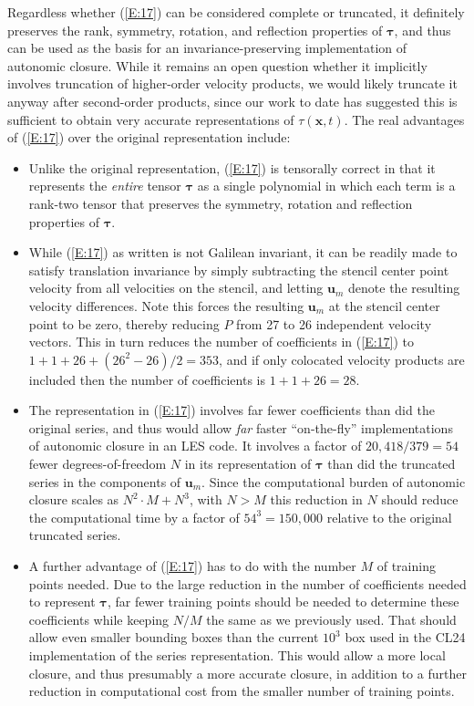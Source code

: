 Regardless whether (\ref{E:17}) can be considered complete or truncated, it definitely preserves the rank, symmetry, rotation, and reflection properties of $\mathbf{\tau}$, and thus can be used as the basis for an invariance-preserving implementation of autonomic closure. While it remains an open question whether it implicitly involves truncation of higher-order velocity products, we would likely truncate it anyway after second-order products, since our work to date has suggested this is sufficient to obtain very accurate representations of $\tau(\mathbf{x},t)$. The real advantages of (\ref{E:17}) over the original  representation include:

\begin{itemize}
	\item 	Unlike the original  representation, (\ref{E:17}) is tensorally correct in that it represents the \textit{entire} tensor  $\mathbf{\tau}$ as a single polynomial in which each term is a rank-two tensor that preserves the symmetry, rotation and reflection properties of $\mathbf{\tau}$.

	\item	While (\ref{E:17}) as written is not Galilean invariant, it can be readily made to satisfy translation invariance by simply subtracting the stencil center point velocity from all velocities on the stencil, and letting  $\mathbf{u}_{m}$ denote the resulting velocity differences.  Note this forces the resulting $\mathbf{u}_{m}$ at the stencil center point to be zero, thereby reducing $P$ from 27 to 26 independent velocity vectors.  This in turn reduces the number of coefficients in (\ref{E:17}) to $1 + 1 + 26 + (26^2 - 26)/2 = 353$, and if only colocated velocity products are included then the number of coefficients is $1 + 1 + 26 = 28$.

	\item	The representation in (\ref{E:17}) involves far fewer coefficients than did the original  series, and thus would allow \textit{far} faster ``on-the-fly'' implementations of autonomic closure in an LES code. It involves a factor of $20,418/379 = 54$  fewer degrees-of-freedom $N$ in its representation of $\mathbf{\tau}$  than did the truncated  series in the components of $\mathbf{u}_{m}$. Since the computational burden of autonomic closure scales as $N^2 \cdot M + N^3$, with $N > M$  this reduction in $N$ should reduce the computational time by a factor of $54^3 = 150,000$  relative to the original truncated  series.

	\item	A further advantage of (\ref{E:17}) has to do with the number $M$ of training points needed. Due to the large reduction in the number of coefficients needed to represent $\mathbf{\tau}$, far fewer training points should be needed to determine these coefficients while keeping $N/M$ the same as we previously used. That should allow even smaller bounding boxes than the current $10^3$ box used in the CL24 implementation of the  series representation. This would allow a more local closure, and thus presumably a more accurate closure, in addition to a further reduction in computational cost from the smaller number of training points.


\end{itemize}
